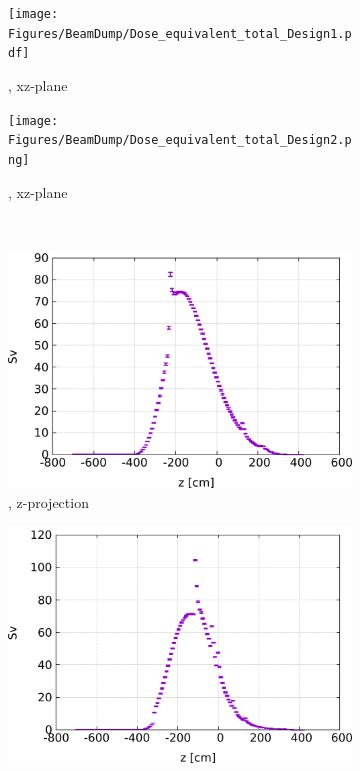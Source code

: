 \begin{figure}[h]
 \centering
  \begin{subfigure}[b]{0.49\textwidth}
   \centering
    \texttt{[image: Figures/BeamDump/Dose\_equivalent\_total\_Design1.pdf]}
   \caption{\designone, xz-plane}
   \end{subfigure}
   \hfill
    \begin{subfigure}[b]{0.49\textwidth}
   \centering
    \texttt{[image: Figures/BeamDump/Dose\_equivalent\_total\_Design2.png]}
   \caption{\designtwo, xz-plane}
   \end{subfigure}\\ \vspace*{0.3cm}
     \begin{subfigure}[b]{0.485\textwidth}
   \centering
    \includegraphics[height=0.24\textheight]{Figures/BeamDump/Dose_equivalent_total_1DMax_z_Design1.png}
   \caption{\designone, z-projection}
   \end{subfigure}
   \hfill
    \begin{subfigure}[b]{0.485\textwidth}
   \centering
    \includegraphics[height=0.24\textheight]{Figures/BeamDump/Dose_equivalent_total_1DMax_z_Design2.png}

\end{subfigure}
\end{figure}
